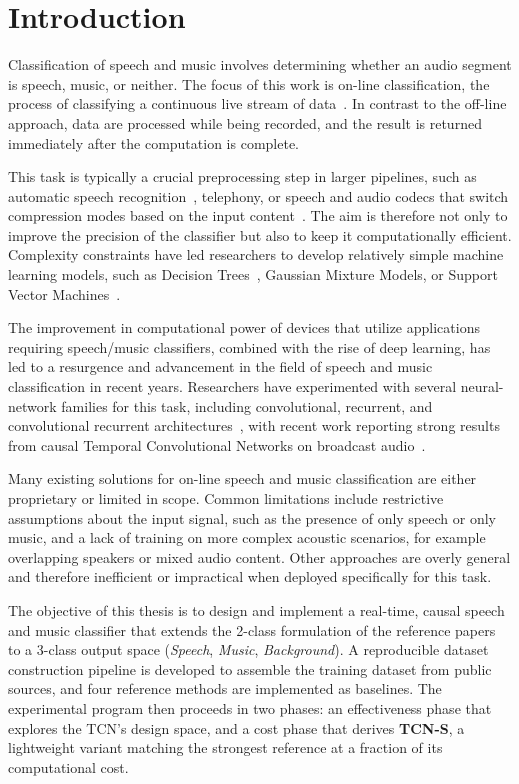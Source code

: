 \chapter{Introduction}
Classification of speech and music involves determining whether an audio segment is speech, music, or neither.
The focus of this work is on-line classification, the process of classifying a continuous live stream of data~\cite{eyben2016realtime}.
In contrast to the off-line approach, data are processed while being recorded, and the result is returned immediately after the computation is complete.

This task is typically a crucial preprocessing step in larger pipelines, such as automatic speech recognition~\cite{benzeghiba2007asr}, telephony, or speech and audio codecs that switch compression modes based on the input content~\cite{neuendorf2013usac}.
The aim is therefore not only to improve the precision of the classifier but also to keep it computationally efficient.
Complexity constraints have led researchers to develop relatively simple machine learning models, such as Decision Trees~\cite{lavner2009dt}, Gaussian Mixture Models, or Support Vector Machines~\cite{khonglah2016gmmsvm}.

The improvement in computational power of devices that utilize applications requiring speech/music classifiers, combined with the rise of deep learning, has led to a resurgence and advancement in the field of speech and music classification in recent years.
Researchers have experimented with several neural-network families for this task, including convolutional, recurrent, and convolutional recurrent architectures~\cite{choi2016crnn}, with recent work reporting strong results from causal Temporal Convolutional Networks on broadcast audio~\cite{lemaire2019tcn}.

Many existing solutions for on-line speech and music classification are either proprietary or limited in scope.
Common limitations include restrictive assumptions about the input signal, such as the presence of only speech or only music, and a lack of training on more complex acoustic scenarios, for example overlapping speakers or mixed audio content.
Other approaches are overly general and therefore inefficient or impractical when deployed specifically for this task.

The objective of this thesis is to design and implement a real-time, causal speech and music classifier that extends the 2-class formulation of the reference papers to a 3-class output space (\emph{Speech}, \emph{Music}, \emph{Background}).
A reproducible dataset construction pipeline is developed to assemble the training dataset from public sources, and four reference methods are implemented as baselines.
The experimental program then proceeds in two phases: an effectiveness phase that explores the TCN's design space, and a cost phase that derives \textbf{TCN-S}, a lightweight variant matching the strongest reference at a fraction of its computational cost.

